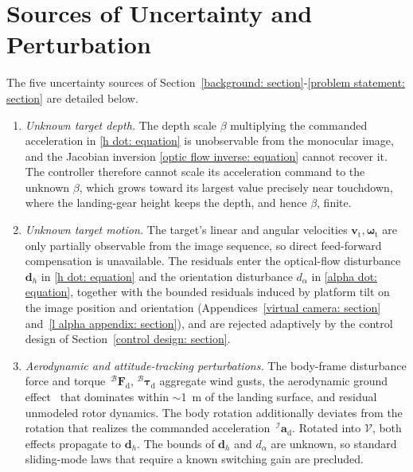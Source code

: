 \documentclass{IEEEtaes}
\theoremstyle{definition}
\theoremstyle{remark}
\begin{document}
\section{Sources of Uncertainty and Perturbation} \label{uncertainty appendix: section}
The five uncertainty sources of Section~\ref{background: section}-\ref{problem statement: section} are detailed below.
\begin{enumerate}
    \item \emph{Unknown target depth.} The depth scale $\beta$ multiplying the commanded acceleration in \eqref{h dot: equation} is unobservable from the monocular image, and the Jacobian inversion \eqref{optic flow inverse: equation} cannot recover it. The controller therefore cannot scale its acceleration command to the unknown $\beta$, which grows toward its largest value precisely near touchdown, where the landing-gear height keeps the depth, and hence $\beta$, finite.
    \item \emph{Unknown target motion.} The target's linear and angular velocities $\boldsymbol{v}_\text{t},\boldsymbol{\omega}_\text{t}$ are only partially observable from the image sequence, so direct feed-forward compensation is unavailable. The residuals enter the optical-flow disturbance $\boldsymbol{d}_h$ in \eqref{h dot: equation} and the orientation disturbance $d_\alpha$ in \eqref{alpha dot: equation}, together with the bounded residuals induced by platform tilt on the image position and orientation (Appendices~\ref{virtual camera: section} and~\ref{l alpha appendix: section}), and are rejected adaptively by the control design of Section~\ref{control design: section}.
    \item \emph{Aerodynamic and attitude-tracking perturbations.} The body-frame disturbance force and torque $\,^\mathcal{B}\boldsymbol{F}_\text{d},\,^\mathcal{B}\boldsymbol{\tau}_\text{d}$ aggregate wind gusts, the aerodynamic ground effect~\cite{sanchez-cuevas2017} that dominates within $\sim$1~m of the landing surface, and residual unmodeled rotor dynamics. The body rotation additionally deviates from the rotation that realizes the commanded acceleration $\,^\mathcal{I}\boldsymbol{a}_\text{d}$. Rotated into $\mathcal{V}$, both effects propagate to $\boldsymbol{d}_h$. The bounds of $\boldsymbol{d}_h$ and $d_\alpha$ are unknown, so standard sliding-mode laws that require a known switching gain are precluded.

\end{enumerate}
\end{document}
